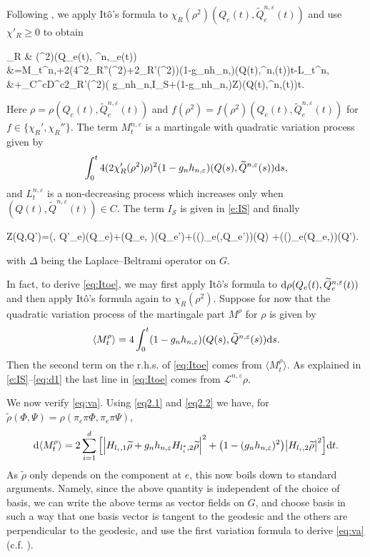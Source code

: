 \documentclass[11pt,UTF-8,reqno]{amsart}
\numberwithin{equation}{section}
\def\eps{\varepsilon}
\def\<{{\langle}}
\def\>{{\rangle}}
\def\dif{{\mathord{{\rm d}}}}
\def\={&\!\!=\!\!&}
\def\cL{{\mathcal L}}
\def\cS{{\mathcal S}}
\def\1{{\mathbf{1}}}
\def\geq{\geqslant}
\def\eps{\varepsilon}
\def\<{{\langle}}
\def\>{{\rangle}}
\def\dif{{\mathord{{\rm d}}}}
\def\={&\!\!=\!\!&}
\def\geq{\geqslant}
\def\<{\langle} \def\>{\rangle}
\begin{document}
Following \cite{Ken86}, \cite[Section 2.1]{Wang} we apply It\^o's formula to
$\chi_R(\rho^2)(Q_e(t),\widetilde{Q}^{n,\eps}_e(t))$ and use $\chi'_R\geq0$ to obtain
\begin{equs}[eq:Itoe]
	\dif\chi_R & (\rho^2)(Q_e(t),  ^{n,\eps}_e(t))
	\\
	&=\dif M_t^{n,\eps}+2(4\rho^2\chi_R''(\rho^2)+2\chi_R'(\rho^2))(1-g_nh_{n,\eps})(Q(t),^{n,\eps}(t))\dif t-\dif L_t^{n,\eps}
	\\
	&\quad +\1_{C^c\cap D^c}2\chi_R'(\rho^2)\rho\Big( g_nh_{n,\eps}I_{\cS}+(1-g_nh_{n,\eps})Z\Big)(Q(t),^{n,\eps}(t))\dif t.
\end{equs}
Here $\rho=\rho(Q_e(t),\widetilde{Q}^{n,\eps}_e(t))$ and $f(\rho^2)=f(\rho^2)(Q_e(t),\widetilde{Q}^{n,\eps}_e(t))$ for $f\in \{\chi_R', \chi_R''\}$. The term $M_t^{n,\eps}$ is a martingale with quadratic variation process given by
$$
\int_0^t4(2\chi_R'(\rho^2)\rho)^2(1-g_nh_{n,\eps})(Q(s),\widetilde{Q}^{n,\eps}(s))\dif s,
$$
and $L_t^{n,\eps}$ is a non-decreasing process
which increases only when $
(Q(t),\widetilde{Q}^{n,\eps}(t))\in C$. The term $I_{\cS}$ is given in \eqref{e:IS} and finally
\begin{equ}[e:ZQQ]
	Z(Q,Q')=\Delta\rho(\cdot, Q'_e)(Q_e)+\Delta\rho(Q_e, \cdot)(Q_e')+\Big((\nabla \cS)\hat\rho_e(\cdot,Q_e')\Big)(Q)
	+\Big((\nabla \cS)\hat\rho_e(Q_e,\cdot)\Big)(Q').
\end{equ}
with $\Delta$ being the Laplace--Beltrami operator on $G$.

In fact,  to derive \eqref{eq:Itoe},
we may first apply It\^o's formula to $\dif \rho(Q_e(t),\widetilde{Q}^{n,\eps}_e(t))$
and then apply It\^o's formula again to $\chi_R(\rho^2)$.
Suppose for now that the quadratic variation process  of the martingale part $M^\rho$ for $\rho$ is given by
\begin{align}\label{eq:va}
	\<M^\rho_t\>=	4\int_0^t(1-g_nh_{n,\eps})(Q(s),\widetilde{Q}^{n,\eps}(s))\dif s.
\end{align}
Then the second term on the r.h.s. of \eqref{eq:Itoe} comes from $\<M^\rho_t\>$. As explained in \eqref{e:IS}--\eqref{eq:d1} the last line in \eqref{eq:Itoe} comes from $\cL^{n,\eps}\rho$.

We now verify \eqref{eq:va}.
Using \eqref{eq2.1} and \eqref{eq2.2} we have,
for $\widetilde\rho(\Phi,\Psi)=\rho(\pi_e\pi\Phi,\pi_e\pi\Psi)$,
\begin{align*}
	\dif\<M^\rho_t\>
	= 2\sum_{i=1}^d\Big[
	\Big|H_{l_i,1}\widetilde\rho +g_nh_{n,\eps} H_{l_i^*,2}\widetilde\rho \Big|^2
	+\big(1-(g_nh_{n,\eps})^2\big)\big|H_{l_i,2}\widetilde\rho\big|^2
	\Big]\dif t.	%
\end{align*}
As $\widetilde\rho$ only depends on the component at $e$,
this now boils down to standard arguments. Namely, since
  the above quantity is independent of the choice of basis,
  we can write the above terms as vector fields on $G$, and
choose basis in such a way that one basis vector is
tangent to the geodesic and the others are perpendicular to the geodesic, and use the first variation formula to derive \eqref{eq:va} (c.f. \cite[Section 6.6]{Hsu}).
\end{document}
